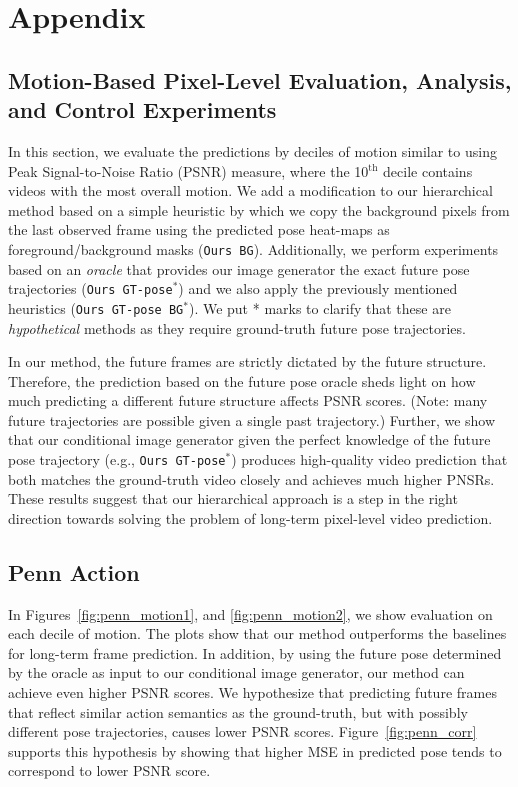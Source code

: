\documentclass{article}
\newcommand{\cutsubsectionup}{\vspace*{-0.09in}}
\newcommand{\cutsubsectiondown}{\vspace*{-0.04in}}
\newcommand{\cutsubsectionup}{}
\newcommand{\cutsubsectiondown}{}
\begin{document}



\clearpage\newpage\onecolumn\section*{\fontsize{15}{18}\selectfont Appendix}\begin{appendix}
\section{Motion-Based Pixel-Level Evaluation, Analysis, and Control Experiments}
\cutsubsectiondown
In this section, we evaluate the predictions by deciles of motion similar to \citet{Villegas17} using Peak Signal-to-Noise Ratio (PSNR) measure, where the 10$^{\text{th}}$ decile contains videos with the most overall motion.
We add a modification to our hierarchical method based on a simple heuristic by which we copy the background pixels from the last observed frame using the predicted pose heat-maps as foreground/background masks (\texttt{Ours BG}).
Additionally, we perform experiments based on an \emph{oracle} that provides our image generator the exact future pose trajectories (\texttt{Ours GT-pose$^*$}) and we also apply the previously mentioned heuristics (\texttt{Ours GT-pose BG$^*$}). We put * marks to clarify that these are \emph{hypothetical} methods as they require ground-truth future pose trajectories. 

In our method, the future frames are strictly dictated by the future structure.
Therefore, the prediction based on the future pose oracle sheds light on how much predicting a different future structure affects PSNR scores. 
(Note: many future trajectories are possible given a single past trajectory.)
Further, we show that our conditional image generator given the perfect knowledge of the future pose trajectory (e.g., \texttt{Ours GT-pose$^*$}) produces high-quality video prediction that both matches the ground-truth video closely and achieves much higher PNSRs. 
These results suggest that our hierarchical approach is a step in the right direction towards solving the problem of long-term pixel-level video prediction.

\cutsubsectionup
\subsection{Penn Action}\label{supp:penn}
\cutsubsectiondown
In Figures~\ref{fig:penn_motion1}, and \ref{fig:penn_motion2}, we show evaluation on each decile of motion.
The plots show that our method outperforms the baselines for long-term frame prediction.
In addition, by using the future pose determined by the oracle as input to our conditional image generator, our method can achieve even higher PSNR scores.
We hypothesize that predicting future frames that reflect similar action semantics as the ground-truth, but with possibly different pose trajectories, causes lower PSNR scores.
Figure~\ref{fig:penn_corr} supports this hypothesis by showing that higher MSE in predicted pose tends to correspond to lower PSNR score.


\end{appendix}
\end{document}

